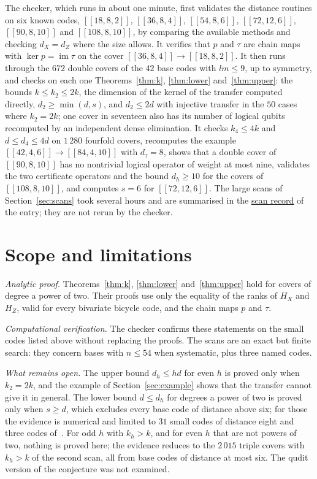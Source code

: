 \documentclass[11pt,a4paper]{article}
\theoremstyle{definition}
\theoremstyle{plain}
\DeclareMathOperator{\im}{im}
\newcommand{\code}[1]{[\![#1]\!]}
\begin{document}
The checker, which runs in about one minute, first validates the distance
routines on six known codes, $\code{18,8,2}$, $\code{36,8,4}$,
$\code{54,8,6}$, $\code{72,12,6}$, $\code{90,8,10}$ and $\code{108,8,10}$, by
comparing the available methods and checking $d_X=d_Z$ where the size allows.
It verifies that $p$ and $\tau$ are chain maps with $\ker p=\im\tau$ on the
cover $\code{36,8,4}\to\code{18,8,2}$. It then runs through the $672$ double
covers of the $42$ base codes with $lm\le9$, up to symmetry, and checks on each
one Theorems~\ref{thm:k}, \ref{thm:lower} and~\ref{thm:upper}: the bounds
$k\le k_2\le2k$, the dimension of the kernel of the transfer computed
directly, $d_2\ge\min(d,s)$, and $d_2\le2d$ with injective transfer in the
$50$ cases where $k_2=2k$; one cover in seventeen also has its number of
logical qubits recomputed by an independent dense elimination. It checks
$k_4\le4k$ and $d\le d_4\le4d$ on $1\,280$ fourfold covers, recomputes the
example $\code{42,4,6}\to\code{84,4,10}$ with $d_\tau=8$, shows that a double
cover of $\code{90,8,10}$ has no nontrivial logical operator of weight at most
nine, validates the two certificate operators and the bound $d_h\ge10$ for the
covers of $\code{108,8,10}$, and computes $s=6$ for $\code{72,12,6}$. The large
scans of Section~\ref{sec:scans} took several hours and are summarised in the
\href{https://github.com/jpbruneton/open_quantum_problems/blob/main/research/entries/bivariate-bicycle-coverings/data/scan_summary.json}{scan record}
of the entry; they are not rerun by the checker.

\section{Scope and limitations}\label{sec:scope}
\emph{Analytic proof.} Theorems~\ref{thm:k}, \ref{thm:lower}
and~\ref{thm:upper} hold for covers of degree a power of two. Their proofs use
only the equality of the ranks of $H_X$ and $H_Z$, valid for every bivariate
bicycle code, and the chain maps $p$ and $\tau$.

\emph{Computational verification.} The checker confirms these statements on
the small codes listed above without replacing the proofs. The scans are an
exact but finite search: they concern bases with $n\le54$ when systematic,
plus three named codes.

\emph{What remains open.} The upper bound $d_h\le hd$ for even $h$ is proved
only when $k_2=2k$, and the example of Section~\ref{sec:example} shows that the
transfer cannot give it in general. The lower bound $d\le d_h$ for degrees a
power of two is proved only when $s\ge d$, which excludes every base code of
distance above six; for those the evidence is numerical and limited to $31$
small codes of distance eight and three codes of~\cite{Bravyi2024}. For odd
$h$ with $k_h>k$, and for even $h$ that are not powers of two, nothing is
proved here; the evidence reduces to the $2\,015$ triple covers with $k_h>k$ of
the second scan, all from base codes of distance at most six. The qudit
version of the conjecture was not examined.
\end{document}
